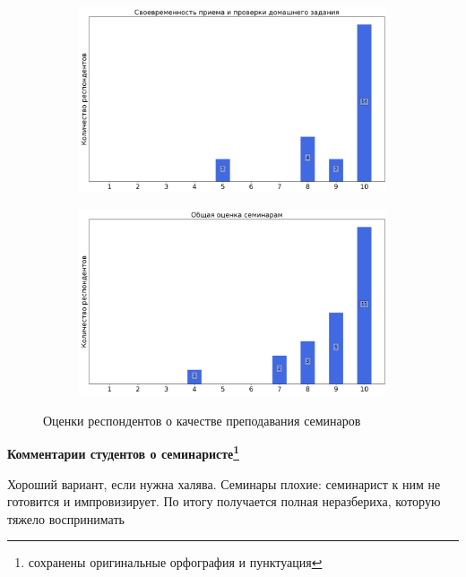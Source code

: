 \begin{figure}[H]
\begin{subfigure}[b]{0.45\textwidth}
                \includegraphics[width=\textwidth]{images/3 course/Теория поля/seminarists-marks-Дьяконов Д.В.-2.png}
            \end{subfigure}
            \begin{subfigure}[b]{0.45\textwidth}
                \centering
                \includegraphics[width=\textwidth]{images/3 course/Теория поля/seminarists-marks-Дьяконов Д.В.-3.png}
            \end{subfigure}	
            \caption{Оценки респондентов о качестве преподавания семинаров}
        \end{figure}

        \textbf{Комментарии студентов о семинаристе\protect\footnote{сохранены оригинальные орфография и пунктуация}}
        \begin{commentbox} 
            Хороший вариант, если нужна халява. Семинары плохие: семинарист к ним не готовится и импровизирует. По итогу получается полная неразбериха, которую тяжело воспринимать 
        \end{commentbox} 
    
